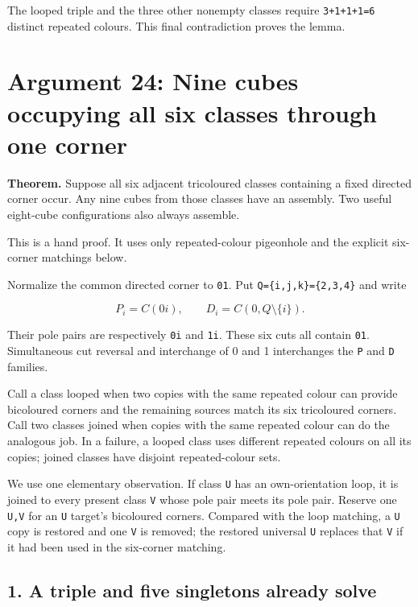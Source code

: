 \documentclass[
  10pt,
]{article}
\begin{document}
The looped triple and the three other nonempty classes require
\texttt{3+1+1+1=6} distinct repeated colours. This final contradiction
proves the lemma.

\hypertarget{arg-24}{%
\section{Argument 24: Nine cubes occupying all six classes through one
corner}\label{arg-24}}

\textbf{Theorem.} Suppose all six adjacent tricoloured classes
containing a fixed directed corner occur. Any nine cubes from those
classes have an assembly. Two useful eight-cube configurations also
always assemble.

This is a hand proof. It uses only repeated-colour pigeonhole and the
explicit six-corner matchings below.

Normalize the common directed corner to \texttt{01}. Put
\texttt{Q=\{i,j,k\}=\{2,3,4\}} and write

\[
P_i=C(0i),\qquad D_i=C(0,Q\setminus\{i\}).
\]

Their pole pairs are respectively \texttt{0i} and \texttt{1i}. These six
cuts all contain \texttt{01}. Simultaneous cut reversal and interchange
of 0 and 1 interchanges the \texttt{P} and \texttt{D} families.

Call a class looped when two copies with the same repeated colour can
provide bicoloured corners and the remaining sources match its six
tricoloured corners. Call two classes joined when copies with the same
repeated colour can do the analogous job. In a failure, a looped class
uses different repeated colours on all its copies; joined classes have
disjoint repeated-colour sets.

We use one elementary observation. If class \texttt{U} has an
own-orientation loop, it is joined to every present class \texttt{V}
whose pole pair meets its pole pair. Reserve one \texttt{U,V} for an
\texttt{U} target's bicoloured corners. Compared with the loop matching,
a \texttt{U} copy is restored and one \texttt{V} is removed; the
restored universal \texttt{U} replaces that \texttt{V} if it had been
used in the six-corner matching.

\hypertarget{a-triple-and-five-singletons-already-solve}{%
\subsection*{1. A triple and five singletons already
solve}\label{a-triple-and-five-singletons-already-solve}}
\end{document}
